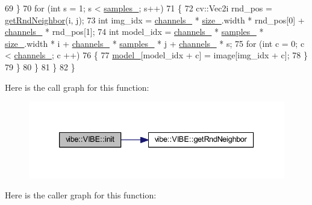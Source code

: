\begin{DoxyCode}
69             \}
70             \textcolor{keywordflow}{for} (\textcolor{keywordtype}{int} s = 1; s < \mbox{\hyperlink{classvibe_1_1_v_i_b_e_ab27dfab66880b3b9fe8ceeafde283f4c}{samples\_}}; s++)
71             \{
72                 cv::Vec2i rnd\_pos = \mbox{\hyperlink{classvibe_1_1_v_i_b_e_a5ca071697edce3a8459f93cba2386516}{getRndNeighbor}}(i, j);
73                 \textcolor{keywordtype}{int} img\_idx = \mbox{\hyperlink{classvibe_1_1_v_i_b_e_a141be141bc39ddd6b9dd04df62b5e3b9}{channels\_}} * \mbox{\hyperlink{classvibe_1_1_v_i_b_e_a4748d53eff7e5a96ad4f98206dc7bb2c}{size\_}}.width * rnd\_pos[0] + 
      \mbox{\hyperlink{classvibe_1_1_v_i_b_e_a141be141bc39ddd6b9dd04df62b5e3b9}{channels\_}} * rnd\_pos[1];
74                 \textcolor{keywordtype}{int} model\_idx = \mbox{\hyperlink{classvibe_1_1_v_i_b_e_a141be141bc39ddd6b9dd04df62b5e3b9}{channels\_}} * \mbox{\hyperlink{classvibe_1_1_v_i_b_e_ab27dfab66880b3b9fe8ceeafde283f4c}{samples\_}} * \mbox{\hyperlink{classvibe_1_1_v_i_b_e_a4748d53eff7e5a96ad4f98206dc7bb2c}{size\_}}.width * i + 
      \mbox{\hyperlink{classvibe_1_1_v_i_b_e_a141be141bc39ddd6b9dd04df62b5e3b9}{channels\_}} * \mbox{\hyperlink{classvibe_1_1_v_i_b_e_ab27dfab66880b3b9fe8ceeafde283f4c}{samples\_}} * j + \mbox{\hyperlink{classvibe_1_1_v_i_b_e_a141be141bc39ddd6b9dd04df62b5e3b9}{channels\_}} * s;
75                 \textcolor{keywordflow}{for} (\textcolor{keywordtype}{int} c = 0; c < \mbox{\hyperlink{classvibe_1_1_v_i_b_e_a141be141bc39ddd6b9dd04df62b5e3b9}{channels\_}}; c ++)
76                 \{
77                     \mbox{\hyperlink{classvibe_1_1_v_i_b_e_af42cd53bbc91e95f14aa6c474bde5601}{model\_}}[model\_idx + c] = image[img\_idx + c];
78                 \}
79             \}
80         \}
81     \}
82 \}
\end{DoxyCode}
Here is the call graph for this function\+:\nopagebreak
\begin{figure}[H]
\begin{center}
\leavevmode
\includegraphics[width=333pt]{classvibe_1_1_v_i_b_e_a4db865cd319617161c13e4303471c33e_cgraph}
\end{center}
\end{figure}
Here is the caller graph for this function\+:\nopagebreak
